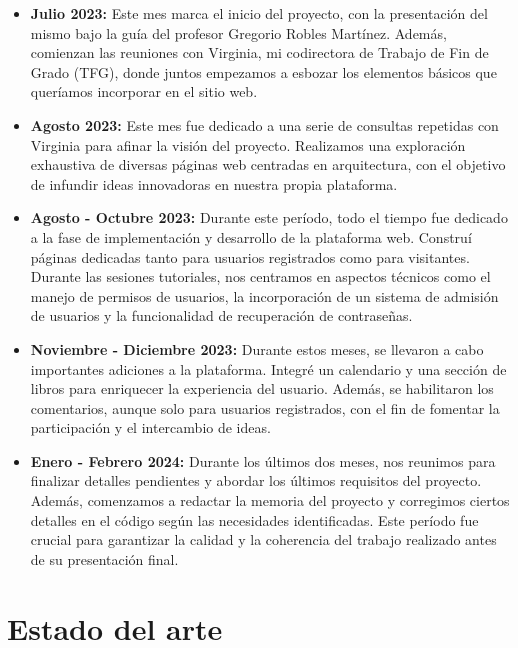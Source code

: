 \documentclass[a4paper, 12pt]{book}
\begin{document}
\begin{itemize}
  \item \textbf{Julio 2023: } Este mes marca el inicio del proyecto, con la presentación del mismo bajo la guía del profesor Gregorio Robles Martínez. Además, comienzan las reuniones con Virginia, mi codirectora de Trabajo de Fin de Grado (TFG), donde juntos empezamos a esbozar los elementos básicos que queríamos incorporar en el sitio web.
  \item \textbf{Agosto 2023: } Este mes fue dedicado a una serie de consultas repetidas con Virginia para afinar la visión del proyecto. Realizamos una exploración exhaustiva de diversas páginas web centradas en arquitectura, con el objetivo de infundir ideas innovadoras en nuestra propia plataforma.
  \item \textbf{Agosto - Octubre 2023: } Durante este período, todo el tiempo fue dedicado a la fase de implementación y desarrollo de la plataforma web. Construí páginas dedicadas tanto para usuarios registrados como para visitantes. Durante las sesiones tutoriales, nos centramos en aspectos técnicos como el manejo de permisos de usuarios, la incorporación de un sistema de admisión de usuarios y la funcionalidad de recuperación de contraseñas.
  \item \textbf{Noviembre - Diciembre 2023: } Durante estos meses, se llevaron a cabo importantes adiciones a la plataforma. Integré un calendario y una sección de libros para enriquecer la experiencia del usuario. Además, se habilitaron los comentarios, aunque solo para usuarios registrados, con el fin de fomentar la participación y el intercambio de ideas.
  \item \textbf{Enero - Febrero 2024: } Durante los últimos dos meses, nos reunimos para finalizar detalles pendientes y abordar los últimos requisitos del proyecto. Además, comenzamos a redactar la memoria del proyecto y corregimos ciertos detalles en el código según las necesidades identificadas. Este período fue crucial para garantizar la calidad y la coherencia del trabajo realizado antes de su presentación final.
\end{itemize}



\cleardoublepage
\chapter{Estado del arte}
\label{chap:estado}
\end{document}
